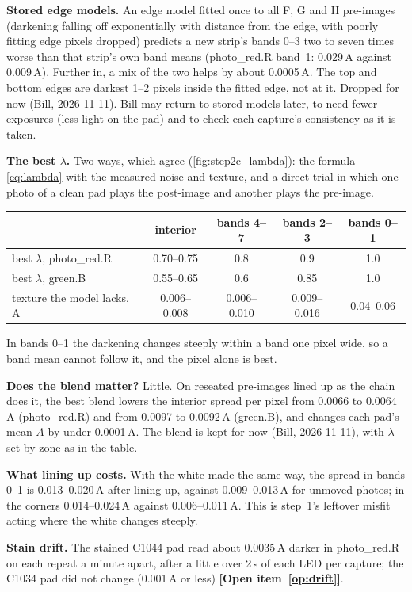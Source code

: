 \documentclass[11pt,letter]{article}
\newcommand{\open}[1]{\textbf{[Open item~\ref{#1}]}}
\begin{document}
\textbf{Stored edge models.}  An edge model fitted once to all F, G and H
pre-images (darkening falling off exponentially with distance from the
edge, with poorly fitting edge pixels dropped) predicts a new strip's
bands 0--3 two to seven times worse than that strip's own band means
(photo\_red.R band~1: 0.029\,A against 0.009\,A).  Further in, a mix of
the two helps by about 0.0005\,A.  The top and bottom edges are darkest
1--2 pixels inside the fitted edge, not at it.  Dropped for now (Bill,
2026-11-11).  Bill may return to stored models later, to need fewer
exposures (less light on the pad) and to check each capture's consistency
as it is taken.

\textbf{The best $\lambda$.}  Two ways, which agree
(\cref{fig:step2c_lambda}): the formula \eqref{eq:lambda} with the measured
noise and texture, and a direct trial in which one photo of a clean pad
plays the post-image and another plays the pre-image.
\begin{center}
\begin{tabular}{@{}lcccc@{}}
\toprule
 & interior & bands 4--7 & bands 2--3 & bands 0--1 \\
\midrule
best $\lambda$, photo\_red.R & 0.70--0.75 & 0.8 & 0.9 & 1.0 \\
best $\lambda$, green.B & 0.55--0.65 & 0.6 & 0.85 & 1.0 \\
texture the model lacks, A & 0.006--0.008 & 0.006--0.010 & 0.009--0.016
  & 0.04--0.06 \\
\bottomrule
\end{tabular}
\end{center}
In bands 0--1 the darkening changes steeply within a band one pixel wide,
so a band mean cannot follow it, and the pixel alone is best.

\textbf{Does the blend matter?}  Little.  On reseated pre-images lined up
as the chain does it, the best blend lowers the interior spread per pixel
from 0.0066 to 0.0064\,A (photo\_red.R) and from 0.0097 to 0.0092\,A
(green.B), and changes each pad's mean $A$ by under 0.0001\,A.  The blend
is kept for now (Bill, 2026-11-11), with $\lambda$ set by zone as in the
table.

\textbf{What lining up costs.}  With the white made the same way, the
spread in bands 0--1 is 0.013--0.020\,A after lining up, against
0.009--0.013\,A for unmoved photos; in the corners 0.014--0.024\,A
against 0.006--0.011\,A.  This is step~1's leftover misfit acting where
the white changes steeply.

\textbf{Stain drift.}  The stained C1044 pad read about 0.0035\,A darker
in photo\_red.R on each repeat a minute apart, after a little over 2\,s of
each LED per capture; the C1034 pad did not change (0.001\,A or less)
\open{op:drift}.
\end{document}
